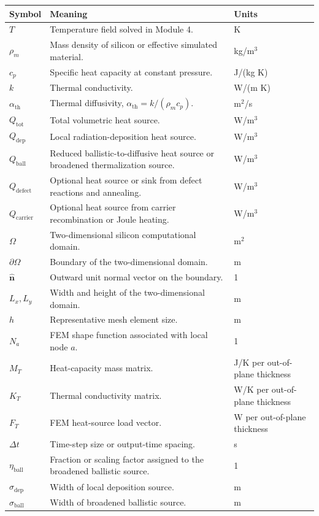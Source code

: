 \documentclass[11pt]{article}
\newcommand{\Tfield}{T}
\newcommand{\Qtot}{Q_{\mathrm{tot}}}
\newcommand{\Qdep}{Q_{\mathrm{dep}}}
\newcommand{\Qball}{Q_{\mathrm{ball}}}
\newcommand{\Qdef}{Q_{\mathrm{defect}}}
\newcommand{\Qcar}{Q_{\mathrm{carrier}}}
\newcommand{\rhoMass}{\rho_m}
\newcommand{\kth}{k}
\newcommand{\alphath}{\alpha_{\mathrm{th}}}
\newcommand{\OmegaT}{\Omega}
\newcommand{\dt}{\Delta t}
\newcommand{\nunit}{\hat{\mathbf n}}
\begin{document}
\renewcommand{\arraystretch}{1.25}
\begin{longtable}{p{}p{}p{}}
\toprule
\textbf{Symbol} & \textbf{Meaning} & \textbf{Units} \\
\midrule
\endhead
$\Tfield$ & Temperature field solved in Module 4. & K \\
$\rhoMass$ & Mass density of silicon or effective simulated material. & kg/m$^3$ \\
$c_p$ & Specific heat capacity at constant pressure. & J/(kg K) \\
$\kth$ & Thermal conductivity. & W/(m K) \\
$\alphath$ & Thermal diffusivity, $\alphath=\kth/(\rhoMass c_p)$. & m$^2$/s \\
$\Qtot$ & Total volumetric heat source. & W/m$^3$ \\
$\Qdep$ & Local radiation-deposition heat source. & W/m$^3$ \\
$\Qball$ & Reduced ballistic-to-diffusive heat source or broadened thermalization source. & W/m$^3$ \\
$\Qdef$ & Optional heat source or sink from defect reactions and annealing. & W/m$^3$ \\
$\Qcar$ & Optional heat source from carrier recombination or Joule heating. & W/m$^3$ \\
$\OmegaT$ & Two-dimensional silicon computational domain. & m$^2$ \\
$\partial\OmegaT$ & Boundary of the two-dimensional domain. & m \\
$\nunit$ & Outward unit normal vector on the boundary. & 1 \\
$L_x,L_y$ & Width and height of the two-dimensional domain. & m \\
$h$ & Representative mesh element size. & m \\
$N_a$ & FEM shape function associated with local node $a$. & 1 \\
$M_T$ & Heat-capacity mass matrix. & J/K per out-of-plane thickness \\
$K_T$ & Thermal conductivity matrix. & W/K per out-of-plane thickness \\
$F_T$ & FEM heat-source load vector. & W per out-of-plane thickness \\
$\dt$ & Time-step size or output-time spacing. & s \\
$\eta_{\mathrm{ball}}$ & Fraction or scaling factor assigned to the broadened ballistic source. & 1 \\
$\sigma_{\mathrm{dep}}$ & Width of local deposition source. & m \\
$\sigma_{\mathrm{ball}}$ & Width of broadened ballistic source. & m \\
\bottomrule
\end{longtable}
\end{document}
